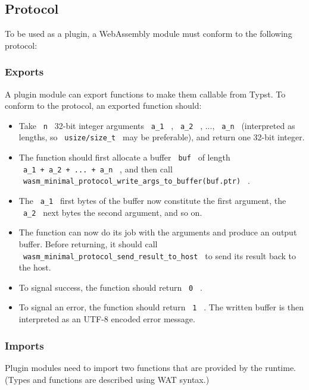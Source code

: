 \subsection{Protocol}\label{protocol}

To be used as a plugin, a WebAssembly module must conform to the
following protocol:

\subsubsection{Exports}\label{exports}

A plugin module can export functions to make them callable from Typst.
To conform to the protocol, an exported function should:

\begin{itemize}
\item
  Take \texttt{\ n\ } 32-bit integer arguments \texttt{\ a\_1\ } ,
  \texttt{\ a\_2\ } , ..., \texttt{\ a\_n\ } (interpreted as lengths, so
  \texttt{\ usize/size\_t\ } may be preferable), and return one 32-bit
  integer.
\item
  The function should first allocate a buffer \texttt{\ buf\ } of length
  \texttt{\ a\_1\ +\ a\_2\ +\ ...\ +\ a\_n\ } , and then call
  \texttt{\ wasm\_minimal\_protocol\_write\_args\_to\_buffer(buf.ptr)\ }
  .
\item
  The \texttt{\ a\_1\ } first bytes of the buffer now constitute the
  first argument, the \texttt{\ a\_2\ } next bytes the second argument,
  and so on.
\item
  The function can now do its job with the arguments and produce an
  output buffer. Before returning, it should call
  \texttt{\ wasm\_minimal\_protocol\_send\_result\_to\_host\ } to send
  its result back to the host.
\item
  To signal success, the function should return \texttt{\ 0\ } .
\item
  To signal an error, the function should return \texttt{\ 1\ } . The
  written buffer is then interpreted as an UTF-8 encoded error message.
\end{itemize}

\subsubsection{Imports}\label{imports}

Plugin modules need to import two functions that are provided by the
runtime. (Types and functions are described using WAT syntax.)

